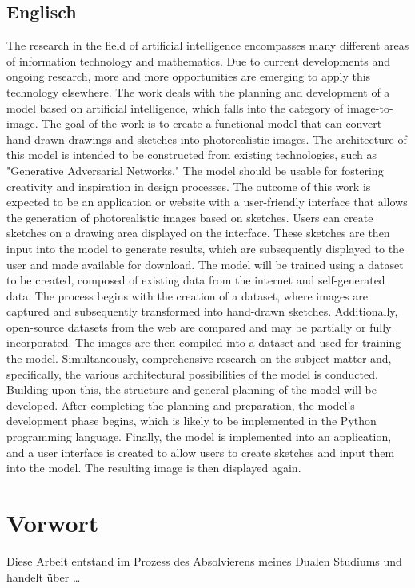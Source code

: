 \documentclass[12pt,a4paper]{article}
\begin{document}
\subsection*{Englisch}
	The research in the field of artificial intelligence encompasses many different areas of information technology and mathematics. 
	Due to current developments and ongoing research, more and more opportunities are emerging to apply this technology elsewhere.
	The work deals with the planning and development of a model based on artificial intelligence, which falls into the category of image-to-image. 
	The goal of the work is to create a functional model that can convert hand-drawn drawings and sketches into photorealistic images. 
	The architecture of this model is intended to be constructed from existing technologies, such as "Generative Adversarial Networks." 
	The model should be usable for fostering creativity and inspiration in design processes.
	The outcome of this work is expected to be an application or website with a user-friendly interface that allows the generation of photorealistic images based on sketches. 
	Users can create sketches on a drawing area displayed on the interface. These sketches are then input into the model to generate results, which are subsequently displayed to the user and made available for download.
	The model will be trained using a dataset to be created, composed of existing data from the internet and self-generated data. 
	The process begins with the creation of a dataset, where images are captured and subsequently transformed into hand-drawn sketches. 
	Additionally, open-source datasets from the web are compared and may be partially or fully incorporated. 
	The images are then compiled into a dataset and used for training the model.
	Simultaneously, comprehensive research on the subject matter and, specifically, the various architectural possibilities of the model is conducted. 
	Building upon this, the structure and general planning of the model will be developed. 
	After completing the planning and preparation, the model's development phase begins, which is likely to be implemented in the Python programming language. 
	Finally, the model is implemented into an application, and a user interface is created to allow users to create sketches and input them into the model. 
	The resulting image is then displayed again.

\newpage
\section*{Vorwort}
	Diese Arbeit entstand im Prozess des Absolvierens meines Dualen Studiums und handelt über \dots
\end{document}
